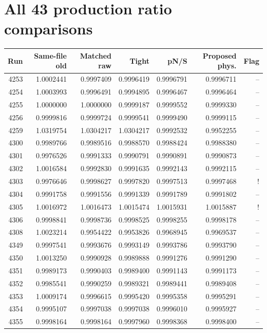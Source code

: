 \section{All 43 production ratio comparisons}
\small\begin{longtable}{rrrrrrr}\toprule Run & Same-file old & Matched raw & Tight & pN/S & Proposed phys. & Flag\\\midrule\endhead
4253 & 1.0002441 & 0.9997409 & 0.9996419 & 0.9996791 & 0.9996711 & --\\
4254 & 1.0003993 & 0.9996491 & 0.9994895 & 0.9996467 & 0.9996464 & --\\
4255 & 1.0000000 & 1.0000000 & 0.9999187 & 0.9999552 & 0.9999330 & --\\
4256 & 0.9999816 & 0.9999724 & 0.9999541 & 0.9999490 & 0.9999115 & --\\
4259 & 1.0319754 & 1.0304217 & 1.0304217 & 0.9992532 & 0.9952255 & --\\
4300 & 0.9989766 & 0.9989516 & 0.9988570 & 0.9988424 & 0.9988380 & --\\
4301 & 0.9976526 & 0.9991333 & 0.9990791 & 0.9990891 & 0.9990873 & --\\
4302 & 1.0016584 & 0.9992830 & 0.9991635 & 0.9992143 & 0.9992115 & --\\
4303 & 0.9976646 & 0.9998627 & 0.9997820 & 0.9997513 & 0.9997468 & !\\
4304 & 0.9991758 & 0.9991556 & 0.9991339 & 0.9991789 & 0.9991802 & --\\
4305 & 1.0016972 & 1.0016473 & 1.0015474 & 1.0015931 & 1.0015887 & !\\
4306 & 0.9998841 & 0.9998736 & 0.9998525 & 0.9998255 & 0.9998178 & --\\
4308 & 1.0023214 & 0.9954422 & 0.9953826 & 0.9968945 & 0.9969537 & --\\
4349 & 0.9997541 & 0.9993676 & 0.9993149 & 0.9993786 & 0.9993790 & --\\
4350 & 1.0013250 & 0.9990928 & 0.9989888 & 0.9991276 & 0.9991290 & --\\
4351 & 0.9989173 & 0.9990403 & 0.9989400 & 0.9991143 & 0.9991173 & --\\
4352 & 0.9985541 & 0.9990259 & 0.9989321 & 0.9989441 & 0.9989408 & --\\
4353 & 1.0009174 & 0.9996615 & 0.9995420 & 0.9995358 & 0.9995291 & --\\
4354 & 0.9995107 & 0.9997038 & 0.9997038 & 0.9996010 & 0.9995927 & --\\
4355 & 0.9998164 & 0.9998164 & 0.9997960 & 0.9998368 & 0.9998400 & --\\

\end{longtable}
